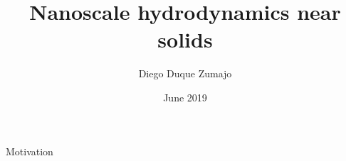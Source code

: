 \documentclass{beamer}
\title{Nanoscale hydrodynamics near solids}
\date{June 2019}
\author{Diego Duque Zumajo}
\institute{Departamento Física Fundamental \\Universidad Nacional de Educación a Distancia}
\begin{document}
\maketitle

\begin{frame}{Motivation}
\end{frame}
\end{document}
